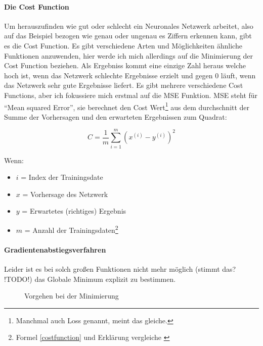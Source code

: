 \paragraph{Die Cost Function}\label{paracost}

Um herauszufinden wie gut oder schlecht ein Neuronales Netzwerk arbeitet, also auf das Beispiel bezogen wie genau oder ungenau es Ziffern erkennen kann, gibt es die Cost Function. Es gibt verschiedene Arten und Möglichkeiten ähnliche Funktionen anzuwenden, hier werde ich mich allerdings auf die Minimierung der Cost Function beziehen. Als Ergebniss kommt eine einzige Zahl heraus welche hoch ist, wenn das Netzwerk schlechte Ergebnisse erzielt und gegen 0 läuft, wenn das Netzwerk sehr gute Ergebnisse liefert. Es gibt mehrere verschiedene Cost Functions, aber ich fokussiere mich erstmal auf die MSE Funktion. MSE steht für "`Mean squared Error"', sie berechnet den Cost Wert\footnote{Manchmal auch Loss genannt, meint das gleiche.} aus dem durchschnitt der Summe der Vorhersagen und den erwarteten Ergebnissen zum Quadrat:

\begin{equation}\label{costfunction}
    C = \frac{1}{m} \sum^{m}_{i=1}(x^{(i)}-y^{(i)})^2
\end{equation}

Wenn:

\begin{itemize}
    \item $i$ = Index der Trainingsdate
    \item $x$ = Vorhersage des Netzwerk
    \item $y$ = Erwartetes (richtiges) Ergebnis
    \item $m$ = Anzahl der Trainingsdaten\footnote{Formel \ref{costfunction} und Erklärung vergleiche \cite{towardsds}}
\end{itemize}

\paragraph{Gradientenabstiegsverfahren}\label{paragrad}

Leider ist es bei solch großen Funktionen nicht mehr möglich (stimmt das? !TODO!) das Globale Minimum explizit zu bestimmen.

\begin{figure}
    
    \caption[2dcost]{Vorgehen bei der Minimierung}
    \label{2dcost}
\end{figure}

